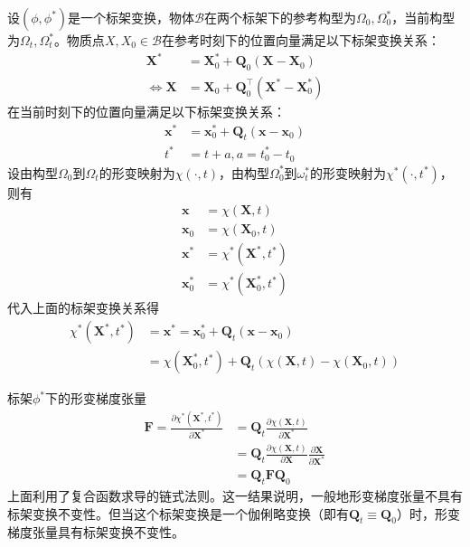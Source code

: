 \documentclass[main.tex]{subfiles}
\begin{document}
设$\left(\phi,\phi^*\right)$是一个标架变换，物体$\mathcal{B}$在两个标架下的参考构型为$\Omega_0^{},\Omega_0^*$，当前构型为$\Omega_t^{},\Omega_t^*$。物质点$X,X_0\in\mathcal{B}$在参考时刻下的位置向量满足以下标架变换关系：
\begin{align*}
\mathbf{X}_{}^*&=\mathbf{X}_0^*+\mathbf{Q}_0\left(\mathbf{X}-\mathbf{X}_0\right)\\
\Leftrightarrow\mathbf{X}&=\mathbf{X}_0+\mathbf{Q}_0^\intercal\left(\mathbf{X}_{}^*-\mathbf{X}_0^*\right)
\end{align*}
在当前时刻下的位置向量满足以下标架变换关系：
\begin{align*}
    \mathbf{x}_{}^*&=\mathbf{x}_0^*+\mathbf{Q}_t\left(\mathbf{x}-\mathbf{x}_0\right)\\
    t^*&=t+a,a=t_0^*-t_0^{}
\end{align*}
设由构型$\Omega_0$到$\Omega_t$的形变映射为$\chi\left(\cdot,t\right)$，由构型$\Omega_0^*$到$\omega_t^*$的形变映射为$\chi^*\left(\cdot,t^*\right)$，则有
\begin{align*}
\mathbf{x}&=\chi\left(\mathbf{X},t\right)\\
\mathbf{x}_0&=\chi\left(\mathbf{X}_0,t\right)\\
\mathbf{x}^*&=\chi^*\left(\mathbf{X}^*,t^*\right)\\
\mathbf{x}_0^*&=\chi^*\left(\mathbf{X}_0^*,t^*\right)
\end{align*}
代入上面的标架变换关系得
\begin{align*}
    \chi^*\left(\mathbf{X}^*,t^*\right)&=\mathbf{x}_{}^*=\mathbf{x}_0^*+\mathbf{Q}_t\left(\mathbf{x}-\mathbf{x}_0\right)\\
    &=\chi\left(\mathbf{X}_0^*,t^*\right)+\mathbf{Q}_t\left(\chi\left(\mathbf{X},t\right)-\chi\left(\mathbf{X}_0,t\right)\right)    
\end{align*}

标架$\phi^*$下的形变梯度张量
\begin{align*}
    \mathbf{F}=\frac{\partial \chi^*\left(\mathbf{X}^*,t^*\right)}{\partial \mathbf{X}^*}&=\mathbf{Q}_t\frac{\partial\chi\left(\mathbf{X},t\right)}{\partial\mathbf{X}^*}\\
    &=\mathbf{Q}_t\frac{\partial\chi\left(\mathbf{X},t\right)}{\partial \mathbf{X}}\frac{\partial\mathbf{X}}{\partial\mathbf{X}^*}\\
    &=\mathbf{Q}_t\mathbf{F}\mathbf{Q}_0
\end{align*}
上面利用了复合函数求导的链式法则。这一结果说明，一般地形变梯度张量不具有标架变换不变性。但当这个标架变换是一个伽俐略变换（即有$\mathbf{Q}_t\equiv\mathbf{Q}_0$）时，形变梯度张量具有标架变换不变性。
\end{document}
